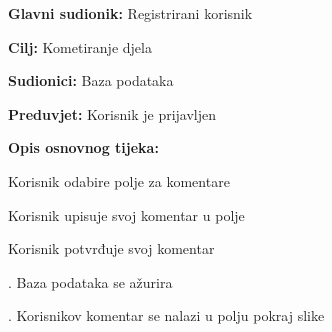 					\noindent {}
					\begin{packed_item}
						
						\item \textbf{Glavni sudionik: } Registrirani korisnik
						\item  \textbf{Cilj:} Kometiranje djela						
						\item \textbf{Sudionici:} Baza podataka
						\item  \textbf{Preduvjet:} Korisnik je prijavljen
						\item  \textbf{Opis osnovnog tijeka:}
						
						\item[] \begin{packed_enum}
							
							\item Korisnik odabire polje za komentare
							\item Korisnik upisuje svoj komentar u polje
							\item Korisnik potvrđuje svoj komentar
							\item . Baza podataka se ažurira
							\item . Korisnikov komentar se nalazi u polju pokraj slike

						\end{packed_enum}
					\end{packed_item}
					
